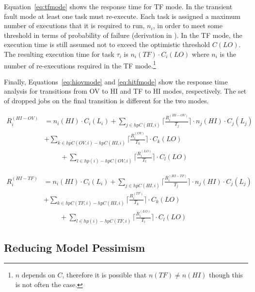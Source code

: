 	Equation~\ref{eq:tfmode} shows the response time for TF mode. 
	In the transient fault mode at least one task must re-execute. 
	Each task is assigned a maximum number of executions that it is required to run, $n_i$, in order to meet some threshold in terms of probability of failure (derivation in \cite{albayati2016modes}). 
	In the TF mode, the execution time is still assumed not to exceed the optimistic threshold $C(LO)$. 
	The resulting execution time for task $\tau_i$ is $n_i(TF) \cdot C_i(LO)$ where $n_i$ is the number of re-executions required in the TF mode.\footnote{$n$ depends on $C$, therefore it is possible that $n(TF) \ne n(HI)$ though this is not often the case.}

	Finally, Equations~\ref{eq:hiovmode} and \ref{eq:hitfmode} show the response time analysis for transitions from OV to HI and TF to HI modes, respectively. The set of dropped jobs on the final transition is different for the two modes.





\begin{equation}\label{eq:hiovmode}
\begin{aligned}
R_i^{(HI-OV)} & = n_i(HI) \cdot C_i(L_i) 
  +\sum_{j \in hpC(HI,i)}\Big\lceil\frac{R_i^{(HI-OV)}}{T_j}\Big\rceil \cdot n_j(HI) \cdot C_j(L_j) \\
&  +\sum_{k \in hpC(OV,i)-hpC(HI,i)}\Big\lceil\frac{R_i^{(OV)}}{T_k}\Big\rceil \cdot C_k(LO) \\
& \hspace{1cm}  +\sum_{l \in hp(i)-hpC(OV,i)}\Big\lceil\frac{R_i^{(LO)}}{T_l}\Big\rceil \cdot C_l(LO)
\end{aligned}
\end{equation}

\begin{equation}\label{eq:hitfmode}
\begin{aligned}
R_i^{(HI-TF)} & = n_i(HI) \cdot C_i(L_i)
  +\sum_{j \in hpC(HI,i)}\Big\lceil\frac{R_i^{(HI-TF)}}{T_j}\Big\rceil \cdot n_j(HI) \cdot C_j(L_j) \\
&  +\sum_{k \in hpC(TF,i)-hpC(HI,i)}\Big\lceil\frac{R_i^{(TF)}}{T_k}\Big\rceil \cdot C_k(LO) \\
& \hspace{1cm}  +\sum_{l \in hp(i)-hpC(TF,i)}\Big\lceil\frac{R_i^{(LO)}}{T_l}\Big\rceil \cdot C_l(LO)
\end{aligned}
\end{equation}

\subsection{Reducing Model Pessimism}

